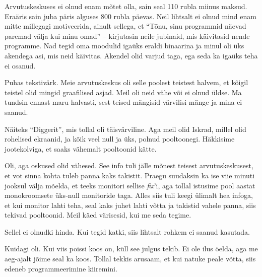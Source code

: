 
Arvutuskeskuses ei olnud enam mõtet olla, sain seal 110 rubla miinus maksud. 
Eraäris sain juba päris alguses 800 rubla päevas. Neil lihtsalt ei 
olnud mind enam mitte millegagi motiveerida, ainult 
sellega, et \enquote{Tõnu, sinu programmid näevad paremad välja kui minu omad} -- 
kirjutasin neile jubinaid, mis käivitasid nende programme. 
Nad tegid oma moodulid igaüks eraldi binaarina ja minul oli üks
akendega asi, mis neid käivitas. Akendel olid varjud taga, ega seda ka igaüks 
teha ei osanud. 


Puhas tekstivärk. Meie arvutuskeskus oli selle poolest teistest halvem, et kõigil teistel olid mingid graafilised asjad. Meil oli neid vähe 
või ei olnud üldse. Ma tundsin ennast maru halvasti, sest teised mängisid 
värvilisi mänge ja mina ei saanud. 


Näiteks \enquote{Diggerit}, mis tollal 
oli täisvärviline. Aga meil olid Iskrad, millel olid rohelised 
ekraanid, ja kõik veel null ja üks, polnud pooltoonegi. 
Häkkisime jootekolviga, et saaks vähemalt pooltoonid kätte. 


Oli, aga oskused olid vähesed. See info tuli jälle mõnest teisest 
arvutuskeskusest, et vot sinna kohta tuleb panna kaks takistit. Praegu 
suudaksin ka ise viie minuti jooksul välja 
mõelda, et teeks monitori sellise \emph{fix}'i, aga tollal istusime
pool aastat monokroomsete üks-null monitoride taga. 
Alles siis tuli keegi ülimalt hea infoga, et kui monitor lahti teha, seal 
kaks juhet lahti võtta ja takistid vahele panna, siis tekivad pooltoonid. Meil käed 
värisesid, kui me seda tegime. 


Sellel ei olnudki hinda. Kui tegid katki, siis lihtsalt rohkem ei saanud kasutada.


Kuidagi oli. Kui viis poissi koos on, küll see julgus tekib. Ei ole ilus 
öelda, aga me aeg-ajalt jõime seal ka koos. Tollal tekkis 
arusaam, et kui natuke peale võtta, siis edeneb programmeerimine 
kiiremini. 

